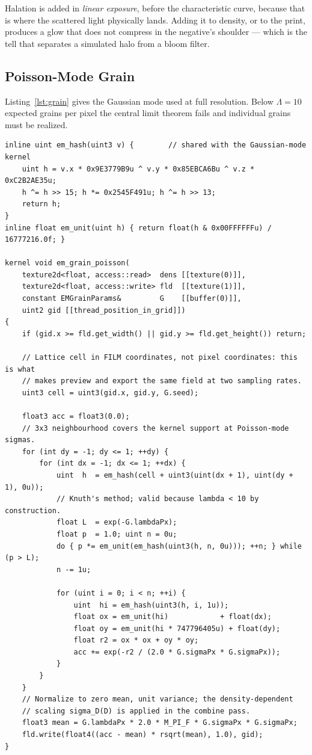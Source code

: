 Halation is added in \emph{linear exposure}, before the characteristic curve,
because that is where the scattered light physically lands. Adding it to
density, or to the print, produces a glow that does not compress in the
negative's shoulder --- which is the tell that separates a simulated halo from
a bloom filter.

\subsection{Poisson-Mode Grain}

Listing~\ref{lst:grain} gives the Gaussian mode used at full resolution.
Below $\Lambda = 10$ expected grains per pixel the central limit theorem fails
and individual grains must be realized.

\begin{lstlisting}[language=Metal, caption={Poisson-mode grain realization.}]
inline uint em_hash(uint3 v) {        // shared with the Gaussian-mode kernel
    uint h = v.x * 0x9E3779B9u ^ v.y * 0x85EBCA6Bu ^ v.z * 0xC2B2AE35u;
    h ^= h >> 15; h *= 0x2545F491u; h ^= h >> 13;
    return h;
}
inline float em_unit(uint h) { return float(h & 0x00FFFFFFu) / 16777216.0f; }

kernel void em_grain_poisson(
    texture2d<float, access::read>  dens [[texture(0)]],
    texture2d<float, access::write> fld  [[texture(1)]],
    constant EMGrainParams&         G    [[buffer(0)]],
    uint2 gid [[thread_position_in_grid]])
{
    if (gid.x >= fld.get_width() || gid.y >= fld.get_height()) return;

    // Lattice cell in FILM coordinates, not pixel coordinates: this is what
    // makes preview and export the same field at two sampling rates.
    uint3 cell = uint3(gid.x, gid.y, G.seed);

    float3 acc = float3(0.0);
    // 3x3 neighbourhood covers the kernel support at Poisson-mode sigmas.
    for (int dy = -1; dy <= 1; ++dy) {
        for (int dx = -1; dx <= 1; ++dx) {
            uint  h  = em_hash(cell + uint3(uint(dx + 1), uint(dy + 1), 0u));
            // Knuth's method; valid because lambda < 10 by construction.
            float L  = exp(-G.lambdaPx);
            float p  = 1.0; uint n = 0u;
            do { p *= em_unit(em_hash(uint3(h, n, 0u))); ++n; } while (p > L);
            n -= 1u;

            for (uint i = 0; i < n; ++i) {
                uint  hi = em_hash(uint3(h, i, 1u));
                float ox = em_unit(hi)            + float(dx);
                float oy = em_unit(hi * 747796405u) + float(dy);
                float r2 = ox * ox + oy * oy;
                acc += exp(-r2 / (2.0 * G.sigmaPx * G.sigmaPx));
            }
        }
    }
    // Normalize to zero mean, unit variance; the density-dependent
    // scaling sigma_D(D) is applied in the combine pass.
    float3 mean = G.lambdaPx * 2.0 * M_PI_F * G.sigmaPx * G.sigmaPx;
    fld.write(float4((acc - mean) * rsqrt(mean), 1.0), gid);
}
\end{lstlisting}

